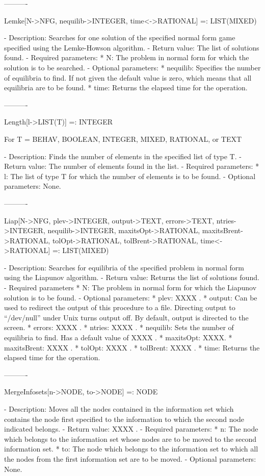 ----------

Lemke[N->NFG, {nequilib->INTEGER}, {time<->RATIONAL}] =: LIST(MIXED)

   -	Description:  Searches for one solution of the specified normal form 
	game specified using the Lemke-Howson algorithm.  
   -	Return value:  The list of solutions found.
   -	Required parameters:
	  *  N:  The problem in normal form for which the solution is to be 
		searched.
   -	Optional parameters: 
	  *  nequilib:  Specifies the number of equilibria to find.  If not
		given the default value is zero, which means that all 
		equilibria are to be found.
	  *  time:  Returns the elapsed time for the operation.

----------

Length[l->LIST(T)] =: INTEGER

	For T = BEHAV, BOOLEAN, INTEGER, MIXED, RATIONAL, or TEXT

   -	Description:  Finds the number of elements in the specified list of 
	type T.
   -	Return value:  The number of elements found in the list.
   -	Required parameters:
	  *  l:  The list of type T for which the number of elements is to be 
		found.
   -	Optional parameters:  None.

----------

Liap[N->NFG, {plev->INTEGER}, {output->TEXT}, {errors->TEXT}, 
	{ntries->INTEGER}, {nequilib->INTEGER}, {maxitsOpt->RATIONAL},
	{maxitsBrent->RATIONAL}, {tolOpt->RATIONAL}, {tolBrent->RATIONAL},
	{time<->RATIONAL}] =: LIST(MIXED)

   -	Description:  Searches for equilibria of the specified problem in 
	normal form using the Liapunov algorithm.
   -	Return value:  Returns the list of solutions found.
   -	Required parameters
	  *  N:  The problem in normal form for which the Liapunov solution is 
		to be found.
   -	Optional parameters:
	  *  plev: XXXX .
	  *  output:  Can be used to redirect the output of this procedure to a
		file.  Directing output to ``/dev/null'' under Unix turns 
		output off.  By default, output is directed to the screen.
	  *  errors:  XXXX .
	  *  ntries:  XXXX .
	  *  nequilib:  Sets the number of equilibria to find.  Has a default 
		value of XXXX . 
	  *  maxitsOpt:  XXXX.
	  *  maxitsBrent:  XXXX .
	  *  tolOpt:  XXXX . 
	  *  tolBrent:  XXXX .
	  *  time:  Returns the elapsed time for the operation.

----------

MergeInfosets[n->NODE, to->NODE] =: NODE

   -	Description:  Moves all the nodes contained in the information set 
	which contains the node first specified to the information to which the
	second node indicated belongs.
   -	Return value:  XXXX .
   -	Required parameters:
	  *  n:  The node which belongs to the information set whose nodes are
		to be moved to the second information set.
	  *  to:  The node which belongs to the information set to which all
		the nodes from the first information set are to be moved.
   -	Optional parameters:  None.

